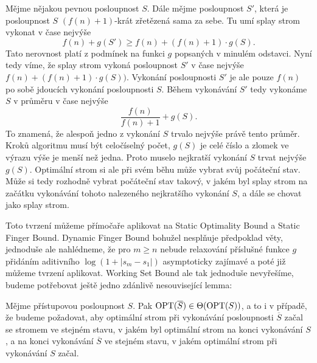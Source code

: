 \begin{dukaz}
Mějme nějakou pevnou posloupnost $S$. Dále mějme posloupnost $S'$, která je
posloupnost $S$ $(f(n)+1)$-krát zřetězená sama za sebe. Tu umí splay strom
vykonat v čase nejvýše $$f(n) + g(S') \geq f(n) + (f(n)+1) \cdot g(S).$$ Tato
nerovnost platí z podmínek na funkci $g$ popsaných v minulém odstavci. Nyní
tedy víme, že splay strom vykoná posloupnost $S'$ v čase nejvýše
$f(n)+(f(n)+1)\cdot g(S))$. Vykonání posloupnosti $S'$ je ale pouze $f(n)$ po
sobě jdoucích vykonání posloupnosti $S$. Během vykonávání $S'$ tedy vykonáme
$S$ v průměru v čase nejvýše $$\frac{f(n)}{f(n)+1}+g(S).$$ To znamená, že
alespoň jedno z vykonání $S$ trvalo nejvýše právě tento průměr.
Kroků algoritmu musí být celočíselný počet, $g(S)$ je celé číslo a zlomek ve výrazu
výše je menší než jedna. Proto muselo nejkratší vykonání $S$ trvat nejvýše $g(S)$.
Optimální strom si ale při svém běhu může vybrat svůj počáteční stav. Může si
tedy rozhodně vybrat počáteční stav takový, v jakém byl splay strom na začátku
vykonávání tohoto nalezeného nejkratšího vykonání $S$, a dále se chovat jako
splay strom.
\end{dukaz}

Toto tvrzení můžeme přímočaře aplikovat na Static Optimality Bound a Static
Finger Bound. Dynamic Finger Bound bohužel nesplňuje předpoklad věty, jednoduše
ale nahlédneme, že pro $m\geq n$ nebude relaxování příslušné funkce $g$
přidáním aditivního $\log(1+|s_{m} - s_{1}|)$ asymptoticky zajímavé a poté již
můžeme tvrzení aplikovat. Working Set Bound ale tak jednoduše nevyřešíme,
budeme potřebovat ještě jedno zdánlivě nesouvisející lemma:

\begin{lemma}
Mějme přístupovou posloupnost $S$. Pak $\operatorname{OPT}(\overline S) \in \Theta(\operatorname{OPT}(S))$, a to i v případě, že budeme požadovat, aby optimální strom při vykonávání posloupnosti $\overline{S}$ začal se stromem ve stejném stavu, v jakém byl optimální strom na konci vykonávání $S$, a na konci vykonávání $\overline S$ ve stejném stavu, v jakém optimální strom při vykonávání $S$ začal.
\end{lemma}

